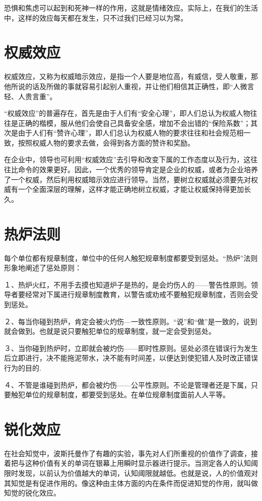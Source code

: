 \documentclass[11pt]{ctexart}
\begin{document}
恐惧和焦虑可以起到和死神一样的作用，这就是情绪效应。实际上，在我们的生活中，这样的效应每天都在发生，只不过我们已经习以为常。
\section{权威效应}
\label{sec-84}


权威效应，又称为权威暗示效应，是指一个人要是地位高，有威信，受人敬重，那他所说的话及所做的事就容易引起别人重视，并让他们相信其正确性，即“人微言轻、人贵言重”。

“权威效应”的普遍存在，首先是由于人们有“安全心理”，即人们总认为权威人物往往是正确的楷模，服从他们会使自己具备安全感，增加不会出错的“保险系数”；其次是由于人们有“赞许心理”，即人们总认为权威人物的要求往往和社会规范相一致，按照权威人物的要求去做，会得到各方面的赞许和奖励。

在企业中，领导也可利用“权威效应”去引导和改变下属的工作态度以及行为，这往往比命令的效果更好。因此，一个优秀的领导肯定是企业的权威，或者为企业培养了一个权威，然后利用权威暗示效应进行领导。当然，要树立权威就必须要先对权威有一个全面深层的理解，这样才能正确地树立权威，才能让权威保持得更加长久。
\section{热炉法则}
\label{sec-85}


每个单位都有规章制度，单位中的任何人触犯规章制度都要受到惩处。“热炉”法则形象地阐述了惩处原则：

１、热炉火红，不用手去摸也知道炉子是热的，是会灼伤人的——警告性原则。领导者要经常对下属进行规章制度教育，以警告或劝戒不要触犯规章制度，否则会受到惩处。

２、每当你碰到热炉，肯定会被火灼伤—一致性原则。“说”和“做”是一致的，说到就会做到。也就是说只要触犯单位的规章制度，就一定会受到惩处。

３、当你碰到热炉时，立即就会被灼伤——即时性原则。惩处必须在错误行为发生后立即进行，决不能拖泥带水，决不能有时间差，以便达到使犯错人及时改正错误行为的目的.

４、不管是谁碰到热炉，都会被灼伤——公平性原则。不论是管理者还是下属，只要触犯单位的规章制度，都要受到惩处。在单位规章制度面前人人平等。
\section{锐化效应}
\label{sec-86}


在社会知觉中，波斯托曼作了有趣的实验，事先对人们所重视的价值作了调查，接着把与这种价值有关的单词在银幕上用瞬时显示器进行提示。当测定各人的认知阈限时发现，以前认为价值越大的单词，认知阈限就越低。也就是说，人的价值观对其知觉是有促进作用的。像这种由主体方面的内在条件而促进知觉的作用，就叫做知觉的锐化效应。
\end{document}
